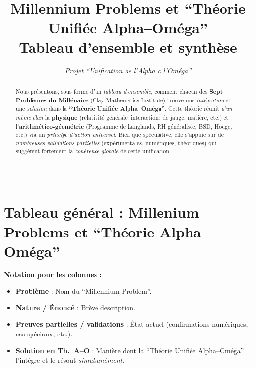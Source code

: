 \documentclass[11pt]{article}
\title{\textbf{Millennium Problems et “Théorie Unifiée Alpha--Oméga”}\\
\large{Tableau d'ensemble et synthèse}}
\author{\textit{Projet “Unification de l’Alpha à l’Oméga”}}
\date{}
\begin{document}
\maketitle

\begin{abstract}
Nous présentons, sous forme d'un \emph{tableau d'ensemble}, comment chacun des \textbf{Sept Problèmes du Millénaire} (Clay Mathematics Institute) trouve une \emph{intégration} et une \emph{solution} dans la \textbf{“Théorie Unifiée Alpha--Oméga”}. Cette théorie réunit \emph{d'un même élan} la \textbf{physique} (relativité générale, interactions de jauge, matière, etc.) et l'\textbf{arithmético-géométrie} (Programme de Langlands, RH généralisée, BSD, Hodge, etc.) via un \emph{principe d'action universel}. Bien que spéculative, elle s'appuie sur de \emph{nombreuses validations partielles} (expérimentales, numériques, théoriques) qui suggèrent fortement la \emph{cohérence globale} de cette unification.
\end{abstract}

\hrule
\vspace{6pt}

\section*{Tableau général : Millenium Problems et “Théorie Alpha--Oméga”}

\noindent
\textbf{Notation pour les colonnes :}
\begin{itemize}
  \item \textbf{Problème} : Nom du “Millennium Problem”.
  \item \textbf{Nature / Énoncé} : Brève description.
  \item \textbf{Preuves partielles / validations} : État actuel (confirmations numériques, cas spéciaux, etc.).
  \item \textbf{Solution en Th.\ A--O} : Manière dont la “Théorie Unifiée Alpha--Oméga” l'intègre et le résout \emph{simultanément}.
\end{itemize}

\medskip
\end{document}
